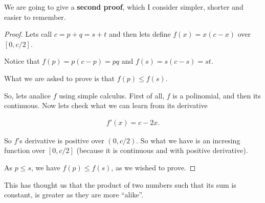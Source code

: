     We are going to give a \textbf{second proof}, which I consider simpler, shorter and easier to remember.
    
    \begin{proof}
        Lets call $c = p + q = s + t$ and then lets define $f(x) = x(c-x)$ over $[0, c/2]$.\pn
        
        Notice that $f(p) = p(c-p) = pq$ and $f(s) = s(c-s) = st$.\pn
            
        What we are asked to prove is that $f(p) \leq f(s)$.\pn
        
        So, lets analice $f$ using simple calculus. First of all, $f$ is a polinomial, and then its continuous. Now
        lets check what we can learn from its derivative\pn
        
        \begin{align}
            f'(x) = c-2x.
        \end{align}\pn
        
        So $f$'s derivative is positive over $(0, c/2)$. So what we have is an incresing function over $[0, c/2]$ 
        (because it is continuous and with positive derivative).\pn 
        
        As $p \leq s$, we have $f(p) \leq f(s)$, as we wished to prove. 
    \end{proof}
    
        This has thought us that the product of two numbers such that its sum is constant, is greater as they are more
        ``alike''.